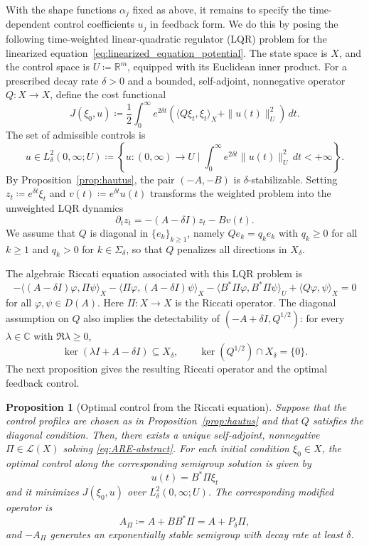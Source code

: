 \documentclass[11pt]{article}
\numberwithin{equation}{section}
\newtheorem{proposition}[theorem]{Proposition}
\theoremstyle{definition}
\newcommand{\R}{\mathbb{R}}
\begin{document}
With the shape functions $\alpha_j$ fixed as above, it remains to specify the time-dependent control coefficients $u_j$ in feedback form.
We do this by posing the following time-weighted linear-quadratic regulator (LQR) problem for the linearized equation~\eqref{eq:linearized_equation_potential}.
The state space is $X$, and the control space is $U \coloneqq \R^m$, equipped with its Euclidean inner product.
For a prescribed decay rate $\delta > 0$ and a bounded, self-adjoint, nonnegative operator $Q : X \to X$, define the cost functional
\begin{equation}
    \label{eq:cost_functional}
    J(\xi_0, u) \coloneqq \frac{1}{2}\int_0^\infty e^{2\delta t} \left(\langle Q\xi_t, \xi_t\rangle_X + \|u(t)\|_U^2\right)\,dt.
\end{equation}
The set of admissible controls is 
\[
u \in L^2_\delta(0,\infty; U) \coloneqq \left\{ u :(0, \infty) \to U \;\Big|\; \int_0^\infty e^{2\delta t}\|u(t)\|_U^2 \, dt < +\infty\right\}.
\]
By Proposition~\ref{prop:hautus}, the pair $(-A, -B)$ is $\delta$-stabilizable.
Setting $z_t \coloneqq e^{\delta t} \xi_t$ and $v(t) \coloneqq e^{\delta t}u(t)$ transforms the weighted problem into the unweighted LQR dynamics
\[
\partial_t z_t = -(A - \delta I)z_t - Bv(t).
\]
We assume that $Q$ is diagonal in $\{e_k\}_{k \ge 1}$, namely $Q e_k = q_k e_k$ with $q_k \ge 0$ for all $k \ge 1$ and $q_k > 0$ for $k \in \Sigma_\delta$, so that $Q$ penalizes all directions in $X_\delta$.

The algebraic Riccati equation associated with this LQR problem is 
\begin{equation}
    \label{eq:ARE-abstract}
    - \langle (A-\delta I)\varphi, \Pi\psi\rangle_X - \langle \Pi\varphi,(A-\delta I)\psi\rangle_X - \langle B^*\Pi\varphi,B^*\Pi\psi\rangle_U + \langle Q\varphi, \psi\rangle_X = 0
\end{equation}
for all $\varphi, \psi \in D(A)$.
Here $\Pi : X \to X$ is the Riccati operator.
The diagonal assumption on $Q$ also implies the detectability of $(-A + \delta I, Q^{1/2})$: for every $\lambda \in \mathbb{C}$ with $\Re\lambda \ge 0$,
\[
\ker(\lambda I + A - \delta I) \subseteq X_\delta, \qquad \ker(Q^{1/2}) \cap X_\delta = \{0\}.
\]
The next proposition gives the resulting Riccati operator and the optimal feedback control.

\begin{proposition}[Optimal control from the Riccati equation]
    \label{prop:are}
    Suppose that the control profiles are chosen as in Proposition~\ref{prop:hautus} and that $Q$ satisfies the diagonal condition.
    Then, there exists a unique self-adjoint, nonnegative $\Pi \in \mathcal{L}(X)$ solving \eqref{eq:ARE-abstract}.
    For each initial condition $\xi_0 \in X$, the optimal control along the corresponding semigroup solution is given by
    \[
    u(t) = B^*\Pi\xi_t
    \]
    and it minimizes $J(\xi_0, u)$ over $L^2_\delta(0,\infty; U)$.
    The corresponding modified operator is
    \[
    A_\Pi \coloneqq A + B B^*\Pi = A + P_\delta\Pi,
    \]
    and $-A_\Pi$ generates an exponentially stable semigroup with decay rate at least $\delta$.
\end{proposition}
\end{document}
